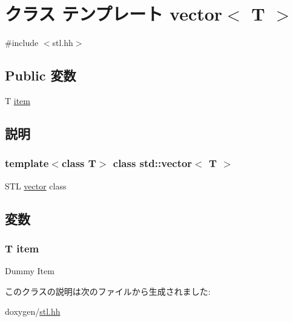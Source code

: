 \hypertarget{classstd_1_1vector}{
\section{クラス テンプレート vector$<$ T $>$}
\label{classstd_1_1vector}
}


{\ttfamily \#include $<$stl.hh$>$}\subsection*{Public 変数}
\begin{DoxyCompactItemize}
\item 
T \hyperlink{classstd_1_1vector_aaeb0f0ed34c31a834ce36fe4defd6c5e}{item}
\end{DoxyCompactItemize}


\subsection{説明}
\subsubsection*{template$<$class T$>$ class std::vector$<$ T $>$}

STL \hyperlink{classstd_1_1vector}{vector} class 

\subsection{変数}
\hypertarget{classstd_1_1vector_aaeb0f0ed34c31a834ce36fe4defd6c5e}{
\subsubsection[{item}]{\setlength{\rightskip}{0pt plus 5cm}T {\bf item}}}
\label{classstd_1_1vector_aaeb0f0ed34c31a834ce36fe4defd6c5e}
Dummy Item 

このクラスの説明は次のファイルから生成されました:\begin{DoxyCompactItemize}
\item 
doxygen/\hyperlink{stl_8hh}{stl.hh}\end{DoxyCompactItemize}
